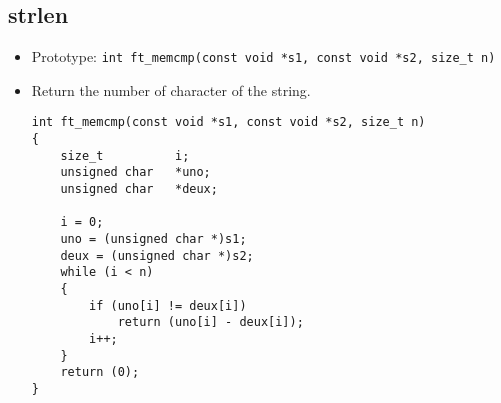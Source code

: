 \documentclass{article}
\begin{document}
		\subsection{strlen}
			\begin{itemize}[label=$\rightarrow$]
				\item Prototype: \texttt{int ft\_memcmp(const void *s1, const void *s2, size\_t n)                         }
				\item Return the number of character of the string.
				\begin{verbatim}
int ft_memcmp(const void *s1, const void *s2, size_t n)                         
{                                                                               
    size_t          i;                                                          
    unsigned char   *uno;                                                       
    unsigned char   *deux;                                                      
                                                                                
    i = 0;                                                                      
    uno = (unsigned char *)s1;                                                  
    deux = (unsigned char *)s2;                                                 
    while (i < n)                                                               
    {                                                                           
        if (uno[i] != deux[i])                                                  
            return (uno[i] - deux[i]);                                          
        i++;                                                                    
    }                                                                           
    return (0);                                                                 
}
				\end{verbatim}
			\end{itemize}
		
\end{document}
